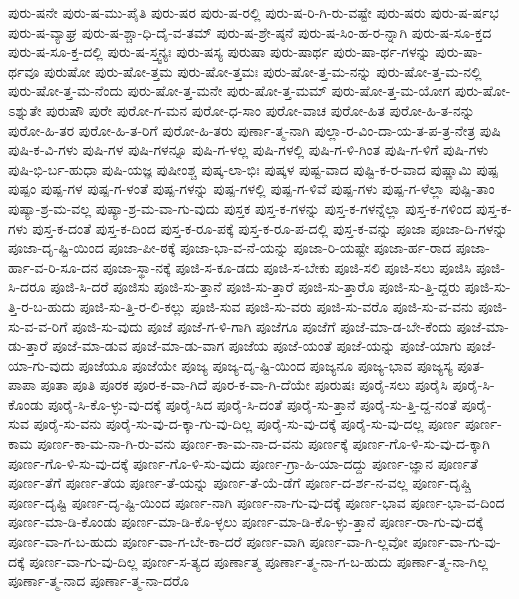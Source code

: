 {ಪುರು-ಷನೇ
ಪುರು-ಷ-ಮು-ಪೈತಿ
ಪುರು-ಷರ
ಪುರು-ಷ-ರಲ್ಲಿ
ಪುರು-ಷ-ರಿ-ಗಿ-ರು-ವಷ್ಟೇ
ಪುರು-ಷರು
ಪುರು-ಷ-ರ್ಷಭ
ಪುರು-ಷ-ವ್ಯಾಘ್ರ
ಪುರು-ಷ-ಶ್ಚಾ-ಧಿ-ದೈ-ವ-ತಮ್
ಪುರು-ಷ-ಶ್ರೇ-ಷ್ಠನೆ
ಪುರು-ಷ-ಸಿಂ-ಹ-ರ-ನ್ನಾಗಿ
ಪುರು-ಷ-ಸೂ-ಕ್ತದ
ಪುರು-ಷ-ಸೂ-ಕ್ತ-ದಲ್ಲಿ
ಪುರು-ಷ-ಸ್ತ್ವನ್ಯಃ
ಪುರು-ಷಸ್ಯ
ಪುರುಷಾ
ಪುರು-ಷಾರ್ಥ
ಪುರು-ಷಾ-ರ್ಥ-ಗಳನ್ನು
ಪುರು-ಷಾ-ರ್ಥವೂ
ಪುರುಷೋ
ಪುರು-ಷೋ-ತ್ತಮ
ಪುರು-ಷೋ-ತ್ತಮಃ
ಪುರು-ಷೋ-ತ್ತ-ಮ-ನನ್ನು
ಪುರು-ಷೋ-ತ್ತ-ಮ-ನಲ್ಲಿ
ಪುರು-ಷೋ-ತ್ತ-ಮ-ನೆಂದು
ಪುರು-ಷೋ-ತ್ತ-ಮನೇ
ಪುರು-ಷೋ-ತ್ತ-ಮಮ್
ಪುರು-ಷೋ-ತ್ತ-ಮ-ಯೋಗ
ಪುರು-ಷೋ-ಽಶ್ನುತೇ
ಪುರುಷೌ
ಪುರೇ
ಪುರೋ-ಗ-ಮನ
ಪುರೋ-ಧ-ಸಾಂ
ಪುರೋ-ವಾಚ
ಪುರೋ-ಹಿತ
ಪುರೋ-ಹಿ-ತ-ನನ್ನು
ಪುರೋ-ಹಿ-ತರ
ಪುರೋ-ಹಿ-ತ-ರಿಗೆ
ಪುರೋ-ಹಿ-ತರು
ಪುರ್ಣಾ-ತ್ಮ-ನಾಗಿ
ಪುಲ್ಲಾ-ರ-ವಿಂ-ದಾ-ಯ-ತ-ಪ-ತ್ರ-ನೇತ್ರ
ಪುಷಿ
ಪುಷಿ-ಕ-ವಿ-ಗಳು
ಪುಷಿ-ಗಳ
ಪುಷಿ-ಗಳನ್ನೂ
ಪುಷಿ-ಗ-ಳಲ್ಲ
ಪುಷಿ-ಗಳಲ್ಲಿ
ಪುಷಿ-ಗ-ಳಿ-ಗಿಂತ
ಪುಷಿ-ಗ-ಳಿಗೆ
ಪುಷಿ-ಗಳು
ಪುಷಿ-ಭಿ-ರ್ಬ-ಹುಧಾ
ಪುಷಿ-ಯಜ್ಞ
ಪುಷೀಂಶ್ಚ
ಪುಷ್ಕ-ಲಾ-ಭಿಃ
ಪುಷ್ಕಳ
ಪುಷ್ಟ-ವಾದ
ಪುಷ್ಟಿ-ಕ-ರ-ವಾದ
ಪುಷ್ಣಾಮಿ
ಪುಷ್ಪ
ಪುಷ್ಪಂ
ಪುಷ್ಪ-ಗಳ
ಪುಷ್ಪ-ಗ-ಳಂತೆ
ಪುಷ್ಪ-ಗಳನ್ನು
ಪುಷ್ಪ-ಗಳಲ್ಲಿ
ಪುಷ್ಪ-ಗ-ಳಿವೆ
ಪುಷ್ಪ-ಗಳು
ಪುಷ್ಪ-ಗ-ಳೆಲ್ಲಾ
ಪುಷ್ಪಿ-ತಾಂ
ಪುಷ್ಯಾ-ಶ್ರ-ಮ-ವಲ್ಲ
ಪುಷ್ಯಾ-ಶ್ರ-ಮ-ವಾ-ಗು-ವುದು
ಪುಸ್ತಕ
ಪುಸ್ತ-ಕ-ಗಳನ್ನು
ಪುಸ್ತ-ಕ-ಗಳನ್ನೆಲ್ಲಾ
ಪುಸ್ತ-ಕ-ಗಳಿಂದ
ಪುಸ್ತ-ಕ-ಗಳು
ಪುಸ್ತ-ಕ-ದಂತೆ
ಪುಸ್ತ-ಕ-ದಿಂದ
ಪುಸ್ತ-ಕ-ರೂ-ಪಕ್ಕೆ
ಪುಸ್ತ-ಕ-ರೂ-ಪ-ದಲ್ಲಿ
ಪುಸ್ತ-ಕ-ವನ್ನು
ಪೂಜಾ
ಪೂಜಾ-ದಿ-ಗಳನ್ನು
ಪೂಜಾ-ದೃ-ಷ್ಟಿ-ಯಿಂದ
ಪೂಜಾ-ಪೀ-ಠಕ್ಕೆ
ಪೂಜಾ-ಭಾ-ವ-ನೆ-ಯನ್ನು
ಪೂಜಾ-ರಿ-ಯಷ್ಟೇ
ಪೂಜಾ-ರ್ಹ-ರಾದ
ಪೂಜಾ-ರ್ಹಾ-ವ-ರಿ-ಸೂ-ದನ
ಪೂಜಾ-ಸ್ಥಾ-ನಕ್ಕೆ
ಪೂಜಿ-ಸ-ಕೂ-ಡದು
ಪೂಜಿ-ಸ-ಬೇಕು
ಪೂಜಿ-ಸಲಿ
ಪೂಜಿ-ಸಲು
ಪೂಜಿಸಿ
ಪೂಜಿ-ಸಿ-ದರೂ
ಪೂಜಿ-ಸಿ-ದರೆ
ಪೂಜಿಸು
ಪೂಜಿ-ಸು-ತ್ತಾನೆ
ಪೂಜಿ-ಸು-ತ್ತಾರೆ
ಪೂಜಿ-ಸು-ತ್ತಾರೊ
ಪೂಜಿ-ಸು-ತ್ತಿ-ದ್ದರು
ಪೂಜಿ-ಸು-ತ್ತಿ-ರ-ಬ-ಹುದು
ಪೂಜಿ-ಸು-ತ್ತಿ-ರ-ಲಿ-ಕಲ್ಲು
ಪೂಜಿ-ಸುವ
ಪೂಜಿ-ಸು-ವರು
ಪೂಜಿ-ಸು-ವರೊ
ಪೂಜಿ-ಸು-ವ-ವನು
ಪೂಜಿ-ಸು-ವ-ವ-ರಿಗೆ
ಪೂಜಿ-ಸು-ವುದು
ಪೂಜೆ
ಪೂಜೆ-ಗ-ಳಿ-ಗಾಗಿ
ಪೂಜೆಗೂ
ಪೂಜೆಗೆ
ಪೂಜೆ-ಮಾ-ಡ-ಬೇ-ಕೆಂದು
ಪೂಜೆ-ಮಾ-ಡು-ತ್ತಾರೆ
ಪೂಜೆ-ಮಾ-ಡುವ
ಪೂಜೆ-ಮಾ-ಡು-ವಾಗ
ಪೂಜೆಯ
ಪೂಜೆ-ಯಂತೆ
ಪೂಜೆ-ಯನ್ನು
ಪೂಜೆ-ಯಾಗು
ಪೂಜೆ-ಯಾ-ಗು-ವುದು
ಪೂಜೆಯೂ
ಪೂಜೆಯೇ
ಪೂಜ್ಯ
ಪೂಜ್ಯ-ದೃ-ಷ್ಟಿ-ಯಿಂದ
ಪೂಜ್ಯನೂ
ಪೂಜ್ಯ-ಭಾವ
ಪೂಜ್ಯಸ್ಯ
ಪೂತ-ಪಾಪಾ
ಪೂತಾ
ಪೂತಿ
ಪೂರಕ
ಪೂರ-ಕ-ವಾ-ಗಿದೆ
ಪೂರ-ಕ-ವಾ-ಗಿ-ದೆಯೇ
ಪೂರುಷಃ
ಪೂರೈ-ಸಲು
ಪೂರೈಸಿ
ಪೂರೈ-ಸಿ-ಕೊಂಡು
ಪೂರೈ-ಸಿ-ಕೊ-ಳ್ಳು-ವು-ದಕ್ಕೆ
ಪೂರೈ-ಸಿದ
ಪೂರೈ-ಸಿ-ದಂತೆ
ಪೂರೈ-ಸು-ತ್ತಾನೆ
ಪೂರೈ-ಸು-ತ್ತಿ-ದ್ದ-ನಂತೆ
ಪೂರೈ-ಸುವ
ಪೂರೈ-ಸು-ವನು
ಪೂರೈ-ಸು-ವು-ದ-ಕ್ಕಾ-ಗು-ವು-ದಿಲ್ಲ
ಪೂರೈ-ಸು-ವು-ದಕ್ಕೆ
ಪೂರೈ-ಸು-ವು-ದಲ್ಲ
ಪೂರ್ಣ
ಪೂರ್ಣ-ಕಾಮ
ಪೂರ್ಣ-ಕಾ-ಮ-ನಾ-ಗಿ-ರು-ವನು
ಪೂರ್ಣ-ಕಾ-ಮ-ನಾ-ದ-ವನು
ಪೂರ್ಣಕ್ಕೆ
ಪೂರ್ಣ-ಗೊ-ಳಿ-ಸು-ವು-ದ-ಕ್ಕಾಗಿ
ಪೂರ್ಣ-ಗೊ-ಳಿ-ಸು-ವು-ದಕ್ಕೆ
ಪೂರ್ಣ-ಗೊ-ಳಿ-ಸು-ವುದು
ಪೂರ್ಣ-ಗ್ರಾ-ಹಿ-ಯಾ-ದದ್ದು
ಪೂರ್ಣ-ಜ್ಞಾನ
ಪೂರ್ಣತೆ
ಪೂರ್ಣ-ತೆಗೆ
ಪೂರ್ಣ-ತೆಯ
ಪೂರ್ಣ-ತೆ-ಯನ್ನು
ಪೂರ್ಣ-ತೆ-ಯೆ-ಡೆಗೆ
ಪೂರ್ಣ-ದ-ರ್ಶ-ನ-ವಲ್ಲ
ಪೂರ್ಣ-ದೃಷ್ಚಿ
ಪೂರ್ಣ-ದೃಷ್ಟಿ
ಪೂರ್ಣ-ದೃ-ಷ್ಟಿ-ಯಿಂದ
ಪೂರ್ಣ-ನಾಗಿ
ಪೂರ್ಣ-ನಾ-ಗು-ವು-ದಕ್ಕೆ
ಪೂರ್ಣ-ಭಾವ
ಪೂರ್ಣ-ಭಾ-ವ-ದಿಂದ
ಪೂರ್ಣ-ಮಾ-ಡಿ-ಕೊಂಡು
ಪೂರ್ಣ-ಮಾ-ಡಿ-ಕೊ-ಳ್ಳಲು
ಪೂರ್ಣ-ಮಾ-ಡಿ-ಕೊ-ಳ್ಳು-ತ್ತಾನೆ
ಪೂರ್ಣ-ರಾ-ಗು-ವು-ದಕ್ಕೆ
ಪೂರ್ಣ-ವಾ-ಗ-ಬ-ಹುದು
ಪೂರ್ಣ-ವಾ-ಗ-ಬೇ-ಕಾ-ದರೆ
ಪೂರ್ಣ-ವಾಗಿ
ಪೂರ್ಣ-ವಾ-ಗಿ-ಲ್ಲವೋ
ಪೂರ್ಣ-ವಾ-ಗು-ವು-ದಕ್ಕೆ
ಪೂರ್ಣ-ವಾ-ಗು-ವು-ದಿಲ್ಲ
ಪೂರ್ಣ-ಸ-ತ್ಯದ
ಪೂರ್ಣಾತ್ಮ
ಪೂರ್ಣಾ-ತ್ಮ-ನಾ-ಗ-ಬ-ಹುದು
ಪೂರ್ಣಾ-ತ್ಮ-ನಾ-ಗಿಲ್ಲ
ಪೂರ್ಣಾ-ತ್ಮ-ನಾದ
ಪೂರ್ಣಾ-ತ್ಮ-ನಾ-ದರೊ
}
